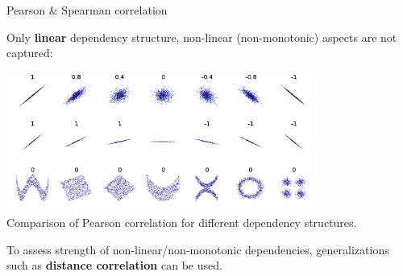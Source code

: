 \documentclass[11pt,compress,t,notes=noshow, xcolor=table]{beamer}
\begin{document}
  \begin{frame2}{Pearson \& Spearman correlation}

  Only \textbf{linear} dependency structure, non-linear (non-monotonic) aspects are not captured:

  \lz

  \begin{center}
\includegraphics[width=0.75\textwidth]{figure_man/correlation_example.png}\\
\footnotesize{Comparison of Pearson correlation for different dependency structures.}
  \end{center}
  \vspace{0.1cm}
  To assess strength of non-linear/non-monotonic dependencies, generalizations such as \textbf{distance correlation} can be used.

  \end{frame2}
\end{document}
